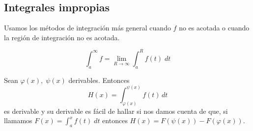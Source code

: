 \documentclass[nochap]{apuntes}
\begin{document}
\subsection{Integrales impropias}

Usamos los métodos de integración más general cuando $f$ no es acotada o cuando la región de integración no es acotada.

\[ \int_a^\infty f = \lim_{R\to\infty}\int_a^R f(t)\;dt \]

Sean $\varphi(x),\; \psi(x)$ derivables. Entonces
\[H(x)=\int_{\varphi(x)}^{\psi(x)}f(t)\,dt \] es derivable y su derivable es fácil de hallar si nos damos cuenta de que, si llamamos $F(x)=\int_a^xf(t)\; dt$ entonces $H(x) = F(\psi(x))-F(\varphi(x))$.
\newpage
\printindex
\end{document}
